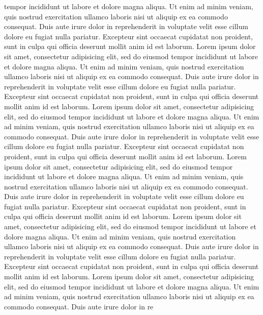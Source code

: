 \documentclass[a4paper,12pt]{article}
\begin{document}
{	tempor incididunt ut labore et dolore magna aliqua. Ut enim ad minim veniam,
	quis nostrud exercitation ullamco laboris nisi ut aliquip ex ea commodo
	consequat. Duis aute irure dolor in reprehenderit in voluptate velit esse
	cillum dolore eu fugiat nulla pariatur. Excepteur sint occaecat cupidatat non
	proident, sunt in culpa qui officia deserunt mollit anim id est laborum.	Lorem ipsum dolor sit amet, consectetur adipisicing elit, sed do eiusmod
	tempor incididunt ut labore et dolore magna aliqua. Ut enim ad minim veniam,
	quis nostrud exercitation ullamco laboris nisi ut aliquip ex ea commodo
	consequat. Duis aute irure dolor in reprehenderit in voluptate velit esse
	cillum dolore eu fugiat nulla pariatur. Excepteur sint occaecat cupidatat non
	proident, sunt in culpa qui officia deserunt mollit anim id est laborum.	Lorem ipsum dolor sit amet, consectetur adipisicing elit, sed do eiusmod
	tempor incididunt ut labore et dolore magna aliqua. Ut enim ad minim veniam,
	quis nostrud exercitation ullamco laboris nisi ut aliquip ex ea commodo
	consequat. Duis aute irure dolor in reprehenderit in voluptate velit esse
	cillum dolore eu fugiat nulla pariatur. Excepteur sint occaecat cupidatat non
	proident, sunt in culpa qui officia deserunt mollit anim id est laborum.	Lorem ipsum dolor sit amet, consectetur adipisicing elit, sed do eiusmod
	tempor incididunt ut labore et dolore magna aliqua. Ut enim ad minim veniam,
	quis nostrud exercitation ullamco laboris nisi ut aliquip ex ea commodo
	consequat. Duis aute irure dolor in reprehenderit in voluptate velit esse
	cillum dolore eu fugiat nulla pariatur. Excepteur sint occaecat cupidatat non
	proident, sunt in culpa qui officia deserunt mollit anim id est laborum.	Lorem ipsum dolor sit amet, consectetur adipisicing elit, sed do eiusmod
	tempor incididunt ut labore et dolore magna aliqua. Ut enim ad minim veniam,
	quis nostrud exercitation ullamco laboris nisi ut aliquip ex ea commodo
	consequat. Duis aute irure dolor in reprehenderit in voluptate velit esse
	cillum dolore eu fugiat nulla pariatur. Excepteur sint occaecat cupidatat non
	proident, sunt in culpa qui officia deserunt mollit anim id est laborum.	Lorem ipsum dolor sit amet, consectetur adipisicing elit, sed do eiusmod
	tempor incididunt ut labore et dolore magna aliqua. Ut enim ad minim veniam,
	quis nostrud exercitation ullamco laboris nisi ut aliquip ex ea commodo
	consequat. Duis aute irure dolor in re	
}\newpage

\end{document}
